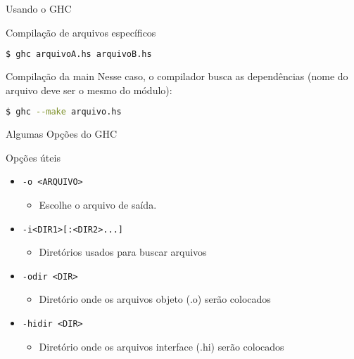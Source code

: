 \documentclass{beamer}
\begin{document}
		
		\begin{frame}[fragile]{Usando o GHC}
		 
		 \begin{block}{Compilação de arquivos específicos}		  
		 \begin{lstlisting}[language=Bash]
$ ghc arquivoA.hs arquivoB.hs
		 \end{lstlisting}
		 \end{block}
		 
		 \begin{block}{Compilação da main}
		  Nesse caso, o compilador busca as dependências (nome do arquivo deve ser o mesmo do módulo):
		  \begin{lstlisting}[language=Bash]
$ ghc --make arquivo.hs
			\end{lstlisting}
		 \end{block}
		 
		\end{frame}
		 
		 
		 \begin{frame}[fragile]{Algumas Opções do GHC}
		 
		 \begin{block}{Opções úteis}
		  \begin{itemize}
		   \item \verb+-o <ARQUIVO>+
				\begin{itemize}
				 \item Escolhe o arquivo de saída.
				\end{itemize}
		   \item \verb+-i<DIR1>[:<DIR2>...]+		   
				\begin{itemize}
				 \item Diretórios usados para buscar arquivos
				\end{itemize}
		   \item \verb+-odir <DIR>+
				\begin{itemize}
				 \item Diretório onde os arquivos objeto (.o) serão colocados
				\end{itemize}
			\item \verb+-hidir <DIR>+
				\begin{itemize}
				 \item Diretório onde os arquivos interface (.hi) serão colocados
				\end{itemize}
		  \end{itemize}
		 \end{block}
		 
		\end{frame}		
		
\end{document}
